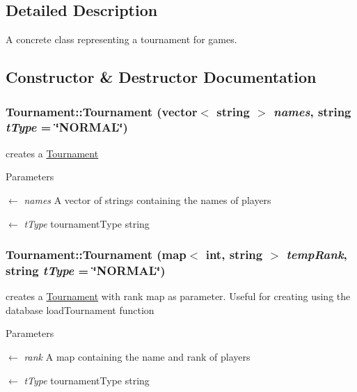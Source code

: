 \subsection{Detailed Description}
A concrete class representing a tournament for games. 

\subsection{Constructor \& Destructor Documentation}
\hypertarget{classTournament_af86539aa2c25a2404b7e724158371071}{
\subsubsection[{Tournament}]{\setlength{\rightskip}{0pt plus 5cm}Tournament::Tournament (vector$<$ string $>$ {\em names}, \/  string {\em tType} = {\ttfamily \char`\"{}NORMAL\char`\"{}})}}
\label{classTournament_af86539aa2c25a2404b7e724158371071}


creates a \hyperlink{classTournament}{Tournament} 
\begin{DoxyParams}{Parameters}
\item[\mbox{$\leftarrow$} {\em names}]A vector of strings containing the names of players \item[\mbox{$\leftarrow$} {\em tType}]tournamentType string \end{DoxyParams}
\hypertarget{classTournament_a31d8b14b4863ce1d2ece89a2f48b8b44}{
\subsubsection[{Tournament}]{\setlength{\rightskip}{0pt plus 5cm}Tournament::Tournament (map$<$ int, string $>$ {\em tempRank}, \/  string {\em tType} = {\ttfamily \char`\"{}NORMAL\char`\"{}})}}
\label{classTournament_a31d8b14b4863ce1d2ece89a2f48b8b44}
creates a \hyperlink{classTournament}{Tournament} with rank map as parameter. Useful for creating using the database loadTournament function 
\begin{DoxyParams}{Parameters}
\item[\mbox{$\leftarrow$} {\em rank}]A map containing the name and rank of players \item[\mbox{$\leftarrow$} {\em tType}]tournamentType string \end{DoxyParams}


